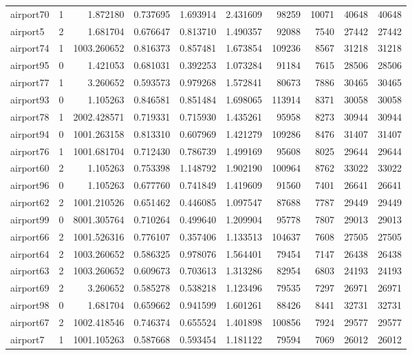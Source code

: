 \documentclass[../../../thesis.tex]{subfiles}
\begin{document}
\begin{longtable}{|l|r|r|r|r|r|r|r|r|r|}
airport70 & 1 & 1.872180 & 0.737695 & 1.693914 & 2.431609 & 98259 & 10071 & 40648 & 40648 \\
airport5 & 2 & 1.681704 & 0.676647 & 0.813710 & 1.490357 & 92088 & 7540 & 27442 & 27442 \\
airport74 & 1 & 1003.260652 & 0.816373 & 0.857481 & 1.673854 & 109236 & 8567 & 31218 & 31218 \\
airport95 & 0 & 1.421053 & 0.681031 & 0.392253 & 1.073284 & 91184 & 7615 & 28506 & 28506 \\
airport77 & 1 & 3.260652 & 0.593573 & 0.979268 & 1.572841 & 80673 & 7886 & 30465 & 30465 \\
airport93 & 0 & 1.105263 & 0.846581 & 0.851484 & 1.698065 & 113914 & 8371 & 30058 & 30058 \\
airport78 & 1 & 2002.428571 & 0.719331 & 0.715930 & 1.435261 & 95958 & 8273 & 30944 & 30944 \\
airport94 & 0 & 1001.263158 & 0.813310 & 0.607969 & 1.421279 & 109286 & 8476 & 31407 & 31407 \\
airport76 & 1 & 1001.681704 & 0.712430 & 0.786739 & 1.499169 & 95608 & 8025 & 29644 & 29644 \\
airport60 & 2 & 1.105263 & 0.753398 & 1.148792 & 1.902190 & 100964 & 8762 & 33022 & 33022 \\
airport96 & 0 & 1.105263 & 0.677760 & 0.741849 & 1.419609 & 91560 & 7401 & 26641 & 26641 \\
airport62 & 2 & 1001.210526 & 0.651462 & 0.446085 & 1.097547 & 87688 & 7787 & 29449 & 29449 \\
airport99 & 0 & 8001.305764 & 0.710264 & 0.499640 & 1.209904 & 95778 & 7807 & 29013 & 29013 \\
airport66 & 2 & 1001.526316 & 0.776107 & 0.357406 & 1.133513 & 104637 & 7608 & 27505 & 27505 \\
airport64 & 2 & 1003.260652 & 0.586325 & 0.978076 & 1.564401 & 79454 & 7147 & 26438 & 26438 \\
airport63 & 2 & 1003.260652 & 0.609673 & 0.703613 & 1.313286 & 82954 & 6803 & 24193 & 24193 \\
airport69 & 2 & 3.260652 & 0.585278 & 0.538218 & 1.123496 & 79535 & 7297 & 26971 & 26971 \\
airport98 & 0 & 1.681704 & 0.659662 & 0.941599 & 1.601261 & 88426 & 8441 & 32731 & 32731 \\
airport67 & 2 & 1002.418546 & 0.746374 & 0.655524 & 1.401898 & 100856 & 7924 & 29577 & 29577 \\
airport7 & 1 & 1001.105263 & 0.587668 & 0.593454 & 1.181122 & 79594 & 7069 & 26012 & 26012 \\

\end{longtable}
\end{document}
